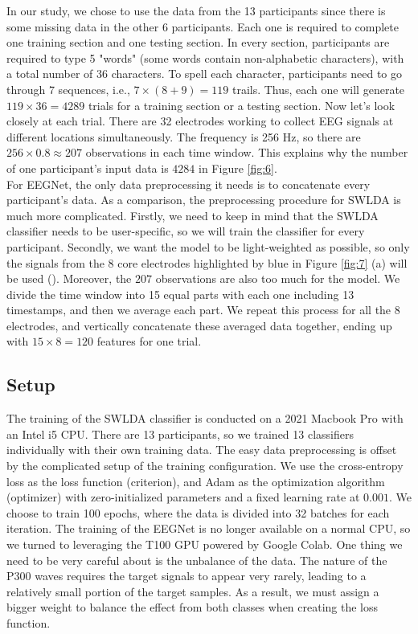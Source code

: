 \documentclass{article}
\begin{document}
\vspace{-3mm}
In our study, we chose to use the data from the 13 participants since there is some missing data in the other 6 participants. Each one is required to complete one training section and one testing section. In every section, participants are required to type 5 "words" (some words contain non-alphabetic characters), with a total number of 36 characters. To spell each character, participants need to go through 7 sequences, i.e., $7 \times (8 + 9) = 119$ trails. Thus, each one will generate $119 \times 36 = 4289$ trials for a training section or a testing section. Now let's look closely at each trial. There are 32 electrodes working to collect EEG signals at different locations simultaneously. The frequency is 256 Hz, so there are $256 \times 0.8 \approx 207$ observations in each time window. This explains why the number of one participant's input data is $4284$ in Figure \ref{fig:6}.\\

\vspace{-3mm}
For EEGNet, the only data preprocessing it needs is to concatenate every participant's data. As a comparison, the preprocessing procedure for SWLDA is much more complicated. Firstly, we need to keep in mind that the SWLDA classifier needs to be user-specific, so we will train the classifier for every participant. Secondly, we want the model to be light-weighted as possible, so only the signals from the 8 core electrodes highlighted by blue in Figure \ref{fig:7} (a) will be used (\cite{krusienski2006comparison}). Moreover, the $207$ observations are also too much for the model. We divide the time window into 15 equal parts with each one including 13 timestamps, and then we average each part. We repeat this process for all the 8 electrodes, and vertically concatenate these averaged data together, ending up with $15 \times 8 = 120$ features for one trial.

\subsection{Setup} \label{Setup}
The training of the SWLDA classifier is conducted on a 2021 Macbook Pro with an Intel i5 CPU. There are 13 participants, so we trained 13 classifiers individually with their own training data. The easy data preprocessing is offset by the complicated setup of the training configuration. We use the cross-entropy loss as the loss function (criterion), and Adam as the optimization algorithm (optimizer) with zero-initialized parameters and a fixed learning rate at $0.001$. We choose to train 100 epochs, where the data is divided into 32 batches for each iteration. The training of the EEGNet is no longer available on a normal CPU, so we turned to leveraging the T100 GPU powered by Google Colab. One thing we need to be very careful about is the unbalance of the data. The nature of the P300 waves requires the target signals to appear very rarely, leading to a relatively small portion of the target samples. As a result, we must assign a bigger weight to balance the effect from both classes when creating the loss function.\\
\end{document}

